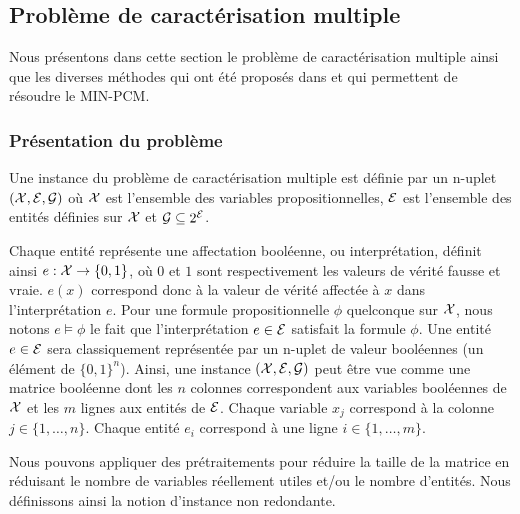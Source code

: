\subsection{Problème de caractérisation multiple}
Nous présentons dans cette section le problème de caractérisation multiple ainsi que les diverses méthodes qui ont été proposés dans \cite{Chhel2012,Chhel2013} et qui permettent de résoudre le MIN-PCM.

\subsubsection{Présentation du problème}

\begin{definition}
Une instance du problème de caractérisation multiple est définie par un n-uplet
$({\cal X}, {\cal E}, {\cal G})$ où $\cal X$ est l'ensemble des
variables propositionnelles, ${\cal E}$ est l'ensemble des entités définies sur
$\cal X$ et ${\cal G} \subseteq 2^{\cal E}$.
\end{definition}

Chaque entité représente une affectation booléenne, ou interprétation, définit ainsi  $e : {\cal X} \to \{0,1\}$, où  $0$ et $1$ sont respectivement les valeurs de vérité fausse et vraie. $e(x)$ correspond donc à la valeur de vérité affectée à $x$ dans l'interprétation $e$. Pour une formule propositionnelle  $\phi$ quelconque sur ${\cal X}$, nous notons $e \models \phi $ le fait que l'interprétation $e \in {\cal E}$ satisfait la formule $\phi$. Une entité $e \in {\cal E}$ sera classiquement représentée par un n-uplet de valeur booléennes (un élément de  $ \{0,1\}^n$).   Ainsi, une instance $({\cal X}, {\cal E}, {\cal G})$  peut être vue comme une matrice booléenne dont les $n$ colonnes correspondent aux variables booléennes de ${\cal X}$ et les $m$ lignes aux entités de ${\cal E}$.  Chaque variable $x_j$ correspond à la colonne $j \in \{1, \ldots, n \} $. Chaque entité $e_i$ correspond à une ligne $i \in \{1, \ldots, m \}$.

Nous pouvons appliquer des prétraitements pour réduire la taille de la matrice en réduisant le nombre de variables réellement utiles et/ou le nombre d'entités. Nous définissons ainsi la notion d'instance non redondante.

